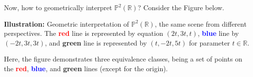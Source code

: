\documentclass[../lecture-notes-148x210.tex]{subfiles}
\begin{document}
\begin{example}
    Now, how to geometrically interpret $\mathbb{P}^2(\mathbb{R})$? Consider the Figure below.

    \begin{center}
        {\textbf{Illustration:} Geometric interpretation of $\mathbb{P}^2(\mathbb{R})$, the same scene from different perspectives. The \textcolor{red}{\textbf{red}} line is represented by equation $(2t,3t,t)$, \textcolor{blue}{\textbf{blue}} line by $(-2t,3t,3t)$, and \textcolor{green!60!black}{\textbf{green}} line is represented by $(t,-2t,5t)$ for parameter $t \in \mathbb{R}$.}
    \end{center}

    Here, the figure demonstrates three equivalence classes, being a set of points on the \textcolor{red}{\textbf{red}}, \textcolor{blue}{\textbf{blue}}, and \textcolor{green!60!black}{\textbf{green}} lines (except for the origin). 
    

\end{example}
\end{document}

